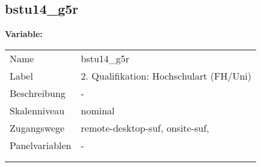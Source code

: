 	
	
	\subsection{bstu14\_g5r}
	\label{subSection:bstu14_g5r}

	\noindent\textbf{Variable:}\\
		\begin{tabular}{lL{11.3cm}}
			\label{tableVariable:bstu14_g5r}
			Name & bstu14\_g5r \\
			Label & 2. Qualifikation: Hochschulart (FH/Uni) \\
			Beschreibung & - \\
			Skalenniveau & nominal \\
			Zugangswege &
				remote-desktop-suf,
				onsite-suf,
 \\
			Panelvariablen & -
			 \\
			 \\
 \\
		\end{tabular}






